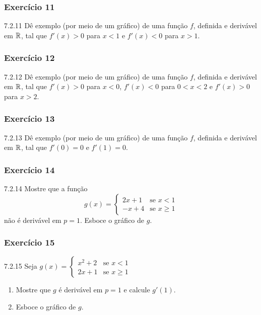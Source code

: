 \subsubsection*{Exercício 11}
\begin{exercicio}[11]{7.2.11}
Dê exemplo (por meio de um gráfico) de uma função $f$, definida e derivável em $\mathbb{R}$, tal que $f'(x) > 0$ para $x < 1$ e $f'(x) < 0$ para $x > 1$.
\end{exercicio}

\subsubsection*{Exercício 12}
\begin{exercicio}[12]{7.2.12}
Dê exemplo (por meio de um gráfico) de uma função $f$, definida e derivável em $\mathbb{R}$, tal que $f'(x) > 0$ para $x < 0$, $f'(x) < 0$ para $0 < x < 2$ e $f'(x) > 0$ para $x > 2$.
\end{exercicio}

\subsubsection*{Exercício 13}
\begin{exercicio}[13]{7.2.13}
Dê exemplo (por meio de um gráfico) de uma função $f$, definida e derivável em $\mathbb{R}$, tal que $f'(0) = 0$ e $f'(1) = 0$.
\end{exercicio}

\subsubsection*{Exercício 14}
\begin{exercicio}[14]{7.2.14}
Mostre que a função
\[
g(x) = \begin{cases} 
2x + 1 & \text{se } x < 1 \\ 
-x + 4 & \text{se } x \ge 1 
\end{cases}
\]
não é derivável em $p = 1$. Esboce o gráfico de $g$.
\end{exercicio}

\subsubsection*{Exercício 15}
\begin{exercicio}[15]{7.2.15}
Seja $g(x) = \begin{cases} x^2 + 2 & \text{se } x < 1 \\ 2x + 1 & \text{se } x \ge 1 \end{cases}$
\begin{enumerate}[label=\alph*)]
    \item Mostre que $g$ é derivável em $p = 1$ e calcule $g'(1)$.
    \item Esboce o gráfico de $g$.
\end{enumerate}
\end{exercicio}

